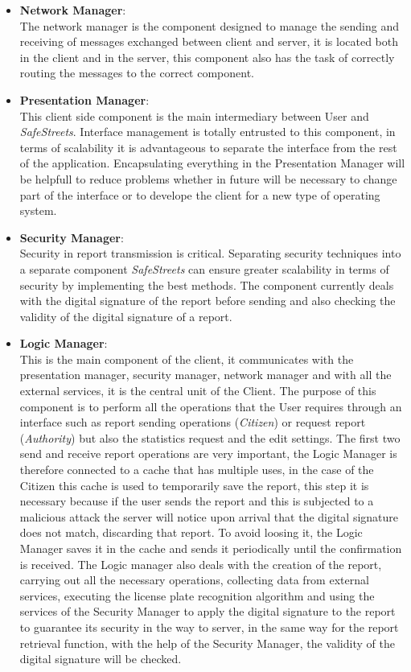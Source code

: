 \documentclass{article}
\begin{document}
\begin{itemize}
\item \textbf{Network Manager}: \\
The network manager is the component designed to manage the sending and receiving of 
messages exchanged between client and server, it is located both in the client and in the 
server, this component also has the task of correctly routing the messages to the correct 
component.


\item \textbf{Presentation Manager}:\\
This client side component is the main intermediary between User and \textit{SafeStreets}. 
Interface management is totally entrusted to this component, in terms of scalability it 
is advantageous to separate the interface from the rest of the application. Encapsulating 
everything in the Presentation Manager will be helpfull to reduce problems whether in future 
will be necessary to change part of the interface or to develope the client for a new type of 
operating system.

\item \textbf{Security Manager}:\\
Security in report transmission is critical. Separating security techniques into a 
separate component \textit{SafeStreets} can ensure greater scalability in terms of security 
by implementing the best methods. The component currently deals with the digital signature 
of the report before sending and also checking the validity of the digital signature of a 
report.

\item \textbf{Logic Manager}: \\
This is the main component of the client, it communicates with the presentation manager, 
security manager, network manager and with all the external services, it is the central 
unit of the Client. The purpose of this component is to perform all the operations that 
the User requires through an interface such as report sending operations (\textit{Citizen}) 
or request report (\textit{Authority}) but also the statistics request and the edit settings. 
The first two send and receive report operations are very important, the Logic Manager 
is therefore connected to a cache that has multiple uses, in the case of the {Citizen} this 
cache is used to temporarily save the report, this step it is necessary because if the user 
sends the report and this is subjected to a malicious attack the server will notice upon 
arrival that the digital signature does not match, discarding that report. To avoid loosing it, 
the Logic Manager saves it in the cache and sends it periodically until the confirmation is 
received. The Logic manager also deals with the creation of the report, carrying out all the 
necessary operations, collecting data from external services, executing the license plate 
recognition algorithm and using the services of the Security Manager to apply the digital 
signature to the report to guarantee its security in the way to server, in the same 
way for the report retrieval function, with the help of the Security Manager, the validity of 
the digital signature will be checked. 
\end{itemize}
\end{document}
